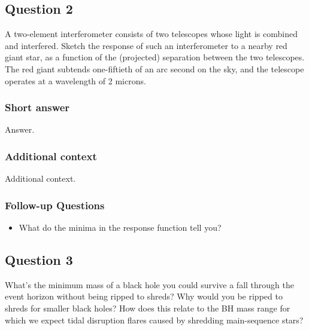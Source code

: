 \documentclass[a4paper,10pt]{article}
\begin{document}

\newpage
\subsection{Question 2}

A two-element interferometer consists of two telescopes whose light is combined and interfered. Sketch the response of such an interferometer to a nearby red giant star, as a function
of the (projected) separation between the two telescopes. The red giant subtends one-fiftieth of an arc second on the sky, and the telescope operates at a wavelength of 2 microns.

\subsubsection{Short answer}

Answer.

\subsubsection{Additional context}

Additional context.

\subsubsection{Follow-up Questions}

\begin{itemize}
    \item What do the minima in the response function tell you?
\end{itemize}


\newpage
\subsection{Question 3}

What's the minimum mass of a black hole you could survive a fall through the event horizon without being ripped to shreds? Why would you be ripped to shreds for smaller black holes? How does this relate to the BH mass range for which we expect tidal disruption flares caused by shredding main-sequence stars?
\end{document}
